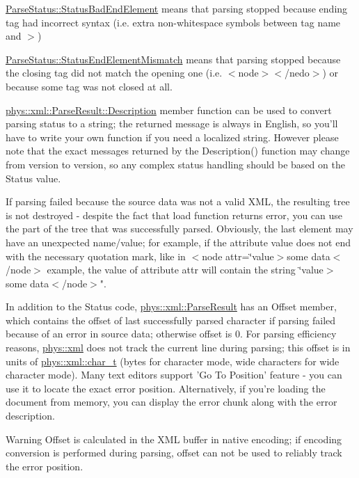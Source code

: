 \begin{DoxyItemize}
\item \hyperlink{namespacephys_1_1xml_ae7aabb879b21c73d8183a54470f8917f}{ParseStatus::StatusBadEndElement} means that parsing stopped because ending tag had incorrect syntax (i.e. extra non-\/whitespace symbols between tag name and $>$)
\item \hyperlink{namespacephys_1_1xml_ae7aabb879b21c73d8183a54470f8917f}{ParseStatus::StatusEndElementMismatch} means that parsing stopped because the closing tag did not match the opening one (i.e. $<$node$>$$<$/nedo$>$) or because some tag was not closed at all.
\end{DoxyItemize}

\hyperlink{structphys_1_1xml_1_1ParseResult_a7f31e89fbe1735e5092adfc352ae5a0d}{phys::xml::ParseResult::Description} member function can be used to convert parsing status to a string; the returned message is always in English, so you'll have to write your own function if you need a localized string. However please note that the exact messages returned by the Description() function may change from version to version, so any complex status handling should be based on the Status value. \par
 \par
 If parsing failed because the source data was not a valid XML, the resulting tree is not destroyed -\/ despite the fact that load function returns error, you can use the part of the tree that was successfully parsed. Obviously, the last element may have an unexpected name/value; for example, if the attribute value does not end with the necessary quotation mark, like in $<$node attr=\char`\"{}value$>$some data$<$/node$>$ example, the value of attribute attr will contain the string \char`\"{}value$>$some data$<$/node$>$". \par
 \par
 In addition to the Status code, \hyperlink{structphys_1_1xml_1_1ParseResult}{phys::xml::ParseResult} has an Offset member, which contains the offset of last successfully parsed character if parsing failed because of an error in source data; otherwise offset is 0. For parsing efficiency reasons, \hyperlink{namespacephys_1_1xml}{phys::xml} does not track the current line during parsing; this offset is in units of \hyperlink{namespacephys_1_1xml_afc87705cd1c2917d87b879715a2d8f6e}{phys::xml::char\_\-t} (bytes for character mode, wide characters for wide character mode). Many text editors support 'Go To Position' feature -\/ you can use it to locate the exact error position. Alternatively, if you're loading the document from memory, you can display the error chunk along with the error description. \begin{DoxyWarning}{Warning}
Offset is calculated in the XML buffer in native encoding; if encoding conversion is performed during parsing, offset can not be used to reliably track the error position.
\end{DoxyWarning}
